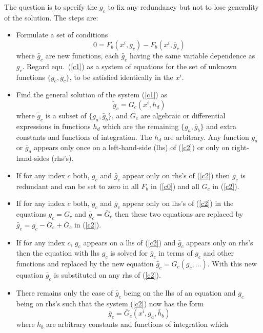 The question is to specify the $g_c$ to fix any redundancy but
not to lose generality of the solution. The steps are:
\begin{itemize}
\item Formulate a set of conditions
\begin{equation}
 0 = F_b(x^i,g_c) - F_b(x^i,\bar{g}_c)     \label{c1}
\end{equation}
where $\bar{g}_c$ are new functions, each $\bar{g}_c$ having the same variable
dependence as $g_c$. Regard equ.\ (\ref{c1}) as a system
of equations for the set of unknown functions $\{g_c, \bar{g}_c\}$,
to be satisfied identically in the $x^i$.
\item Find the general solution of the system (\ref{c1}) as
\begin{equation}
\tilde{g}_c = G_c(x^i,h_d)  \label{c2}
\end{equation}
where $\tilde{g}_c$ is a subset of $\{g_a,\bar{g}_b\}$, and
$G_c$ are algebraic or differential expressions in functions
$h_d$ which are the remaining $\{g_a,\bar{g}_b\}$ and extra constants and functions
of integration. The $h_d$ are arbitrary. Any function $g_a$ or $\bar{g}_a$
appears only once on a left-hand-side (lhs) of (\ref{c2}) or only on
right-hand-sides (rhs's).
\item
If for any index $c$ both, $g_c$ and $\bar{g}_c$ appear only on rhs's
of (\ref{c2}) then $g_c$ is redundant and can be set to zero in all $F_b$
in (\ref{c0}) and all $G_c$ in (\ref{c2}).
\item
If for any index $c$ both, $g_c$ and $\bar{g}_c$ appear only on
lhs's of (\ref{c2}) in the equations $g_c=G_c$ and $\bar{g}_c=\bar{G}_c$
then these two equations are replaced by $\bar{g}_c = g_c-G_c+\bar{G}_c$ in (\ref{c2}).
\item
If for any index $c$, $g_c$ appears on a lhs of (\ref{c2})
and $\bar{g}_c$ appears only on rhs's then the equation with lhs $g_c$ is solved
for $\bar{g}_c$ in terms of $g_c$ and other functions and replaced by the
new equation $\bar{g}_c=\bar{G}_c(g_c,\ldots)$. With this new equation $\bar{g}_c$ is
substituted on any rhs of (\ref{c2}).
\item
There remains only the case of $\bar{g}_c$ being on the lhs of an equation
and $g_c$ being on rhs's such that the system (\ref{c2}) now has the form
\begin{equation}
\bar{g}_c = \bar{G}_c(x^i,g_a,\bar{h}_b)    \label{c3}
\end{equation}
where $\bar{h}_b$ are arbitrary constants and functions of integration which

\end{itemize}
